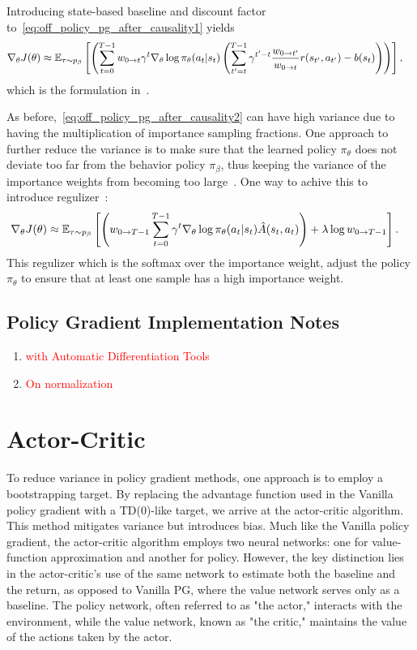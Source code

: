 \documentclass{article}
\begin{document}
Introducing state-based baseline and discount factor to~\eqref{eq:off_policy_pg_after_causality1} yields
\begin{align}
\nabla_\theta J(\theta) &\approx {\mathbb E}_{\tau \sim p_\beta} \left[\left(\sum_{t=0}^{T-1} w_{0\to t}\gamma^t \nabla_\theta \log \pi_\theta(a_t\vert s_t)  \left(\sum_{t^\prime=t}^{T-1} \gamma^{t^\prime - t}\frac{w_{{0} \to {t^\prime}}}{w_{{0} \to {t}}} r(s_{t^\prime}, a_{t^\prime}) - b(s_t)\right)\right) \right],\label{eq:off_policy_pg_after_causality2}
\end{align}
which is the formulation in~\cite{precup2000eligibility}.

As before,~\eqref{eq:off_policy_pg_after_causality2} can have high variance due to having the multiplication of importance sampling fractions.
One approach to further reduce the variance is to make sure that the learned policy $\pi_\theta$ does not deviate too far from the behavior policy $\pi_\beta$, thus keeping the variance of the importance weights from becoming too large~\cite{levine2020offline}.
One way to achive this to introduce regulizer~\cite{levine2013guided,levine2020offline}:
\begin{align*}
\nabla_\theta J(\theta) &\approx {\mathbb E}_{\tau \sim p_\beta} \left[\left( w_{{0} \to {T-1}} \sum_{t=0}^{T-1}\gamma^t \nabla_\theta \log \pi_\theta (a_t\vert s_t) \hat A(s_t,a_t)\right) + \lambda \log w_{{0} \to {T-1}}\right].
\end{align*}
This regulizer which is the softmax over the importance weight, adjust the policy $\pi_\theta$ to ensure that at least one sample has a high importance weight.

\subsection{Policy Gradient Implementation Notes}

\begin{enumerate}
    \item \textcolor{red}{with Automatic Differentiation Tools}
    \item \textcolor{red}{On normalization}
\end{enumerate}

\newpage
\section{Actor-Critic}

To reduce variance in policy gradient methods, one approach is to employ a bootstrapping target. By replacing the advantage function used in the Vanilla policy gradient with a TD(0)-like target, we arrive at the actor-critic algorithm. This method mitigates variance but introduces bias. Much like the Vanilla policy gradient, the actor-critic algorithm employs two neural networks: one for value-function approximation and another for policy. However, the key distinction lies in the actor-critic's use of the same network to estimate both the baseline and the return, as opposed to Vanilla PG, where the value network serves only as a baseline. The policy network, often referred to as "the actor," interacts with the environment, while the value network, known as "the critic," maintains the value of the actions taken by the actor.
\end{document}
